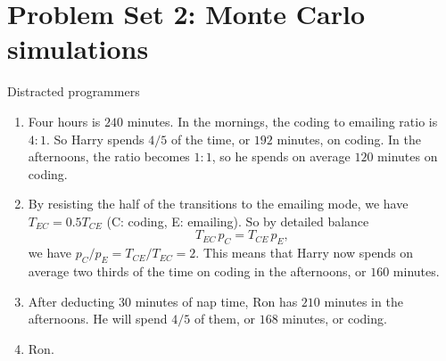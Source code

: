 \documentclass[12pt]{article}
\begin{document}
\pagebreak

\section{Problem Set 2: Monte Carlo simulations}


\begin{problem}{Distracted programmers}
\begin{enumerate}
  \item
    Four hours is $240$ minutes.
    In the mornings, the coding to emailing ratio is $4:1$.
    So Harry spends $4/5$ of the time, or $192$ minutes, on coding.
    In the afternoons, the ratio becomes $1:1$,
    so he spends on average $120$ minutes on coding.

  \item
    By resisting the half of the transitions to the emailing mode,
    we have $T_{EC} = 0.5 T_{CE}$ (C: coding, E: emailing).
    So by detailed balance
    $$
    T_{EC} \, p_C = T_{CE} \, p_E,
    $$
    we have $p_C / p_E = T_{CE} / T_{EC} = 2$.
    This means that Harry now spends on average two thirds of the time
    on coding in the afternoons, or $160$ minutes.

  \item
    After deducting $30$ minutes of nap time,
    Ron has $210$ minutes in the afternoons.
    He will spend $4/5$ of them, or $168$ minutes, or coding.

  \item
    Ron.
\end{enumerate}
\end{problem}
\end{document}
